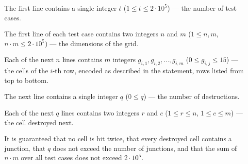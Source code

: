 The first line contains a single integer $t$ ($1 \le t \le 2 \cdot 10^5$) --- the number of test cases.

The first line of each test case contains two integers $n$ and $m$ ($1 \le n, m$, $n \cdot m \le 2 \cdot 10^5$) --- the dimensions of the grid.

Each of the next $n$ lines contains $m$ integers $g_{i,1}, g_{i,2}, \ldots, g_{i,m}$ ($0 \le g_{i,j} \le 15$) --- the cells of the $i$-th row, encoded as described in the statement, rows listed from top to bottom.

The next line contains a single integer $q$ ($0 \le q$) --- the number of destructions.

Each of the next $q$ lines contains two integers $r$ and $c$ ($1 \le r \le n$, $1 \le c \le m$) --- the cell destroyed next.

It is guaranteed that no cell is hit twice, that every destroyed cell contains a junction, that $q$ does not exceed the number of junctions, and that the sum of $n \cdot m$ over all test cases does not exceed $2 \cdot 10^5$.
